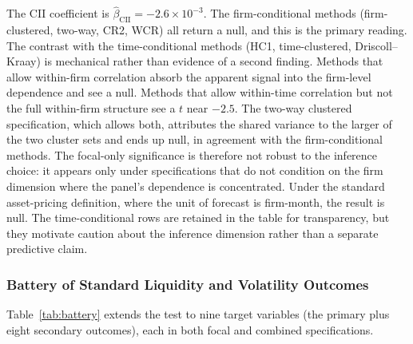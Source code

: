\documentclass[preprint,12pt,authoryear]{elsarticle}
\begin{document}
The CII coefficient is $\hat{\beta}_{\mathrm{CII}} = -2.6 \times 10^{-3}$. The firm-conditional methods (firm-clustered, two-way, CR2, WCR) all return a null, and this is the primary reading. The contrast with the time-conditional methods (HC1, time-clustered, Driscoll--Kraay) is mechanical rather than evidence of a second finding. Methods that allow within-firm correlation absorb the apparent signal into the firm-level dependence and see a null. Methods that allow within-time correlation but not the full within-firm structure see a $t$ near $-2.5$. The two-way clustered specification, which allows both, attributes the shared variance to the larger of the two cluster sets and ends up null, in agreement with the firm-conditional methods. The focal-only significance is therefore not robust to the inference choice: it appears only under specifications that do not condition on the firm dimension where the panel's dependence is concentrated. Under the standard asset-pricing definition, where the unit of forecast is firm-month, the result is null. The time-conditional rows are retained in the table for transparency, but they motivate caution about the inference dimension rather than a separate predictive claim.

\subsubsection{Battery of Standard Liquidity and Volatility Outcomes}

Table~\ref{tab:battery} extends the test to nine target variables (the primary plus eight secondary outcomes), each in both focal and combined specifications.
\end{document}
